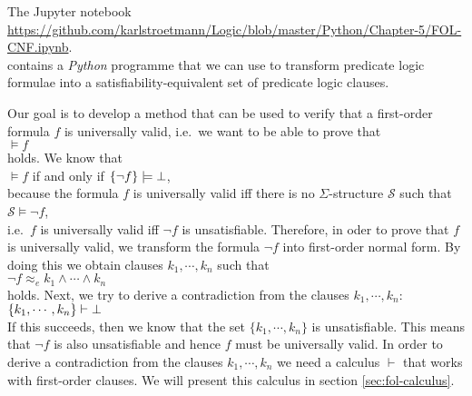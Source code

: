 \noindent
The Jupyter notebook
\\[0.2cm]
\hspace*{0.8cm}
\href{https://github.com/karlstroetmann/Logic/blob/master/Python/Chapter-5/FOL-CNF.ipynb}{https://github.com/karlstroetmann/Logic/blob/master/Python/Chapter-5/FOL-CNF.ipynb}.
\\[0.2cm]
contains a \textsl{Python} programme that we can use to transform predicate logic formulae into a 
satisfiability-equivalent set of predicate logic clauses.

Our goal is to develop a method that can be used to verify that a first-order formula
$f$ is universally valid, i.e.~we want to be able to prove that \\[0.2cm]
\hspace*{1.3cm}
$\models f$
\\[0.2cm]
holds.  We know that \\[0.2cm]
\hspace*{1.3cm}
$\models f$ \quad if and only if \quad $\{\neg f\} \models \bot$, \\[0.2cm]
because the formula $f$ is universally valid iff there is no $\Sigma$-structure $\mathcal{S}$ such that
\\[0.2cm]
\hspace*{1.3cm}
$\mathcal{S} \models \neg f$,
\\[0.2cm]
i.e.~$f$ is universally valid iff $\neg f$ is unsatisfiable. 
Therefore, in oder to prove that $f$ is universally valid, we transform the formula $\neg f$  into 
first-order normal form.  By doing this we obtain clauses $k_1, \cdots, k_n$ such that \\[0.2cm]
\hspace*{1.3cm} $\neg f \approx_e k_1 \wedge \cdots \wedge k_n$ \\[0.2cm]
holds.  Next,  we try to
derive a contradiction from the clauses $k_1,\cdots,k_n$: \\[0.2cm]
\hspace*{1.3cm} $\{k_1, \cdots, k_n\} \vdash \bot$ \\[0.2cm]
If this succeeds, then we know that the set $\{k_1, \cdots, k_n\}$ is unsatisfiable.
This means that $\neg f$ is also unsatisfiable and hence $f$ must be universally valid.
In order to derive a contradiction from the clauses $k_1,\cdots,k_n$
we need a calculus $\vdash$ that works with first-order clauses. 
We will present this calculus in section \ref{sec:fol-calculus}.

